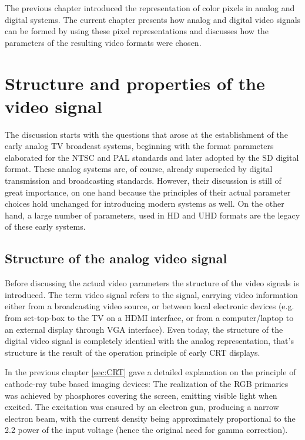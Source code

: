 The previous chapter introduced the representation of color pixels in analog and digital systems.
The current chapter presents how analog and digital video signals can be formed by using these pixel representations and discusses how the parameters of the resulting video formats were chosen.

\section{Structure and properties of the video signal}

The discussion starts with the questions that arose at the establishment of the early analog TV broadcast systems, beginning with the format parameters elaborated for the NTSC and PAL standards and later adopted by the SD digital format.
These analog systems are, of course, already superseded by digital transmission and broadcasting standards.
However, their discussion is still of great importance, on one hand because the principles of their actual parameter choices hold unchanged for introducing modern systems as well.
On the other hand, a large number of parameters, used in HD and UHD formats are the legacy of these early systems.

\subsection{Structure of the analog video signal}

Before discussing the actual video parameters the structure of the video signals is introduced.
The term video signal refers to the signal, carrying video information either from a broadcasting video source, or between local electronic devices (e.g. from set-top-box to the TV on a HDMI interface, or from a computer/laptop to an external display through VGA interface).
Even today, the structure of the digital video signal is completely identical with the analog representation, that's structure is the result of the operation principle of early CRT displays.

In the previous chapter \ref{sec:CRT} gave a detailed explanation on the principle of cathode-ray tube based imaging devices:
The realization of the RGB primaries was achieved by phosphores covering the screen, emitting visible light when excited.
The excitation was ensured by an electron gun, producing a narrow electron beam, with the current density being approximately proportional to the 2.2 power of the input voltage (hence the original need for gamma correction).

